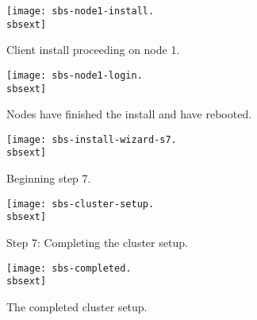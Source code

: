\begin{figure}[htbp]
  \begin{center}
    \texttt{[image: sbs-node1-install.\\sbsext]}
    \caption{Client install proceeding on node 1.}
    \label{fig:sbs-node1-install}
  \end{center}
\end{figure}

\begin{figure}[htbp]
  \begin{center}
    \texttt{[image: sbs-node1-login.\\sbsext]}
    \caption{Nodes have finished the install and have rebooted.}
    \label{fig:sbs-node1-login}
  \end{center}
\end{figure}

\begin{figure}[htbp]
  \begin{center}
    \texttt{[image: sbs-install-wizard-s7.\\sbsext]}
    \caption{Beginning step 7.}
    \label{fig:sbs-install-wizard-s7}
  \end{center}
\end{figure}

\begin{figure}[htbp]
  \begin{center}
    \texttt{[image: sbs-cluster-setup.\\sbsext]}
    \caption{Step 7: Completing the cluster setup.}
    \label{fig:sbs-cluster-setup}
  \end{center}
\end{figure}

\begin{figure}[htbp]
  \begin{center}
    \texttt{[image: sbs-completed.\\sbsext]}
    \caption{The completed cluster setup.}
    \label{fig:sbs-completed}
  \end{center}
\end{figure}

\clearpage

